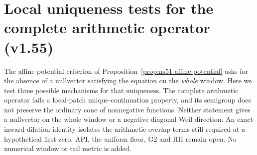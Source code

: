 \section{Local uniqueness tests for the complete arithmetic operator (v1.55)}
\label{sec:v155-local-uniqueness}

The affine-potential criterion of Proposition~\ref{prop:ns51-affine-potential}
asks for the absence of a nullvector satisfying the equation on the
\emph{whole} window. Here we test three possible mechanisms for that
uniqueness. The complete arithmetic operator fails a local-patch
unique-continuation property, and its semigroup does not preserve the
ordinary cone of nonnegative functions. Neither statement gives a
nullvector on the whole window or a negative diagonal Weil direction.
An exact inward-dilation identity isolates the arithmetic overlap
terms still required at a hypothetical first zero. API, the uniform
floor, G2 and RH remain open. No numerical window or tail metric is added.

